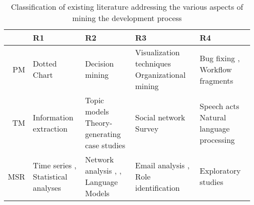 \begin{table}[H]
\centering
\caption{Classification of existing literature addressing the various aspects of mining the development process}
\label{table:literature-classification}
\begin{tabular}{@{}r>{\raggedright}p{3cm}>{\raggedright}p{3cm}>{\raggedright}p{3cm}>{\raggedright\arraybackslash}p{3cm}@{}}
\multicolumn{1}{l}{} & R1                                              & R2                                                                                               & R3 & R4                                      \\ \midrule

PM & Dotted Chart \cite{Song2007} & Decision mining \cite{Rozinat2006} & Visualization techniques \cite{Baumgrass2013} Organizational mining \cite{Song2008} \cite{Schonig2015} & Bug fixing \cite{Poncin2011a}, Workflow fragments \cite{kindler2006activity,kindler2006incremental} \\
TM & Information extraction \cite{cowie1996information} & Topic models \cite{Chen2016a} Theory-generating case studies \cite{Lindberg2016} & Social network \cite{Bird2006} Survey \cite{Begel2010} \cite{DeA.R.Goncalves2010} & Speech acts \cite{DiCiccio2013a} \cite{Campos2018} Natural language processing \cite{Friedrich2011} \\
MSR & Time series \cite{Ruohonen2015} \cite{Hou2014}, Statistical analyses \cite{Oliva2011} & Network analysis \cite{DAmbros2009}, \cite{Zimmermann2008}, Language Models \cite{Allamanis2013} & Email analysis \cite{Bird2006}, Role identification \cite{Yu.LiguoRamaswamy.2007} & Exploratory studies \cite{Gousios2014} \\ \bottomrule
\end{tabular}
\vspace*{-\baselineskip}
\end{table}